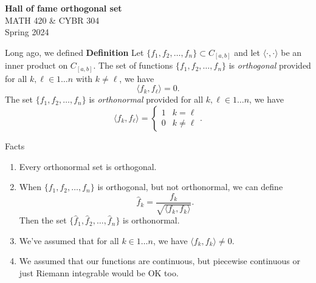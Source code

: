 \documentclass[portrait,fleqn,12pt]{beamer}
\newenvironment{handlist}
   {\begin{enumerate}[\faHandPointRight]
       \addtolength{\itemsep}{0.0\itemsep}}
     {\end{enumerate}}
\newenvironment{define}[1]{
  \textbf{Definition} #1}{}
\begin{document}
\begin{frame}
\begin{flushleft} 
\textbf{Hall of fame orthogonal set } \\
MATH 420 \& CYBR 304 \\
Spring 2024 
\end{flushleft}



\end{frame}

\begin{frame}{Long ago, we defined}
\begin{define}
Let $\{f_1, f_2, \dots, f_n \}  \subset  C_{[a,b]}$ and let $\langle \cdot, \cdot \rangle$ be an inner product
on $C_{[a,b]}$.  The set of functions $\{f_1, f_2, \dots, f_n \}$ 
is \emph{orthogonal} provided for all $k, \ell \in 1 \dots n$ with
$k \neq \ell$, we have
\begin{equation}
   \langle f_k, f_\ell \rangle = 0.
\end{equation}
The set $\{f_1, f_2, \dots, f_n \}$  is \emph{orthonormal} provided for all $k, \ell \in 1 \dots n$,
we have
\begin{equation}
\langle f_k, f_\ell \rangle = \begin{cases} 1 & k=\ell \\ 0 & k \neq \ell \end{cases}.
\end{equation}
\end{define}

\end{frame}
  
\begin{frame}{Facts}
\begin{handlist}
\item Every orthonormal set is orthogonal.

\item When $\{f_1, f_2, \dots, f_n \} $ is orthogonal, but not orthonormal, 
we can define
\begin{equation}
   \widehat f_k = \frac{f_k}{\sqrt{ \langle f_k, f_k \rangle}}.
\end{equation}
Then the set $\{\widehat f_1, \widehat f_2, \dots, \widehat f_n \}$ is orthonormal.

\item We've assumed that for all $k \in 1 \dots n$, we have 
$\langle f_k, f_k \rangle \neq 0$.

\item We assumed that our functions are continuous, but piecewise 
continuous or just Riemann integrable would be OK too.
\end{handlist}
\end{frame}
\end{document}
